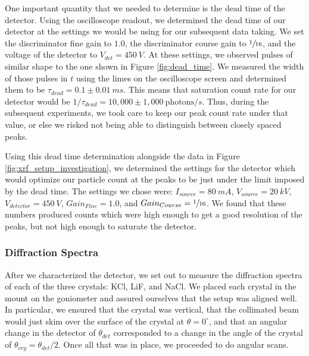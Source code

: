 \documentclass[%
 reprint,
 amsmath,amssymb,
 aps,
 pra,
]{revtex4-1}
\begin{document}
One important quantity that we needed to determine is the dead time of the detector. Using the oscilloscope readout, we determined the dead time of our detector at the settings we would be using for our subsequent data taking. We set the discriminator fine gain to $1.0$, the discriminator course gain to $\sfrac{1}{16}$, and the voltage of the detector to $V_{det} = 450~V$. At these settings, we observed pulses of similar shape to the one shown in Figure \ref{fig:dead_time}. We measured the width of those pulses in $t$ using the limes on the oscilloscope screen and determined them to be $\tau_{dead} = 0.1 \pm 0.01~ms$. This means that saturation count rate for our detector would be $1/\tau_{dead} = 10,000 \pm 1,000~\text{photons}/s$. Thus, during the subsequent experiments, we took care to keep our peak count rate under that value, or else we risked not being able to distinguish between closely spaced peaks.

Using this dead time determination alongside the data in Figure \ref{fig:xrf_setup_investigation}, we determined the settings for the detector which would optimize our particle count at the peaks to be just under the limit imposed by the dead time. The settings we chose were: $I_{source} = 80~mA$, $V_{source} = 20~kV$, $V_{detector} = 450~V$, $Gain_{Fine} = 1.0$, and $Gain_{Course} = \sfrac{1}{16}$. We found that these numbers produced counts which were high enough to get a good resolution of the peaks, but not high enough to saturate the detector.

\subsubsection{Diffraction Spectra}

After we characterized the detector, we set out to measure the diffraction spectra of each of the three crystals: KCl, LiF, and NaCl. We placed each crystal in the mount on the goniometer and assured ourselves that the setup was aligned well. In particular, we ensured that the crystal was vertical, that the collimated beam would just skim over the surface of the crystal at $\theta = 0^\circ$, and that an angular change in the detector of $\theta_{det}$ corresponded to a change in the angle of the crystal of $\theta_{cry} = \theta_{det}/2$. Once all that was in place, we proceeded to do angular scans. 
\end{document}
